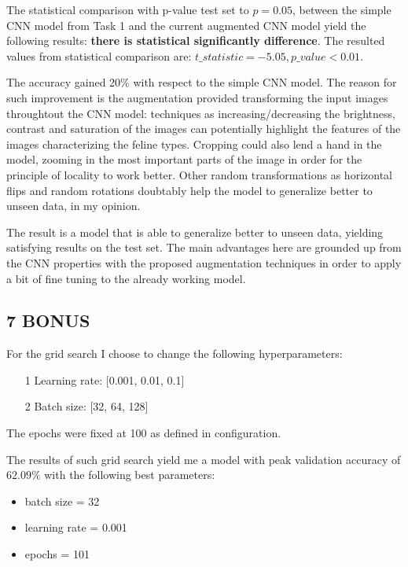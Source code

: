 \documentclass[11pt]{scrartcl}
\begin{document}
The statistical comparison with p-value test set to 
\( p = 0.05 \),
between the simple CNN model from Task 1 and the current augmented CNN model yield 
the following results:
\textbf{there is statistical significantly difference}.
The resulted values from statistical comparison are:
\( t\_statistic = -5.05, p\_value < 0.01 \).

The accuracy gained 20\% with respect to the simple CNN model.
The reason for such improvement is the augmentation provided
transforming the input images throughtout the CNN model:
techniques as increasing/decreasing the brightness, contrast and saturation 
of the images can potentially highlight the features of the images 
characterizing the feline types.
Cropping could also lend a hand in the model, 
zooming in the most important parts of the image
in order for the principle of locality to work better.
Other random transformations as horizontal flips and random rotations
doubtably help the model to generalize better to unseen data, in my opinion.

The result is a model that is able to generalize better to unseen data,
yielding satisfying results on the test set.
The main advantages here are grounded up from the CNN properties 
with the proposed augmentation techniques in order to apply a bit of fine tuning to the already 
working model.


\subsection*{7 BONUS}

For the grid search I choose to change the following hyperparameters:
\begin{itemize}
	\item[1] Learning rate: [0.001, 0.01, 0.1]
	\item[2] Batch size: [32, 64, 128]
\end{itemize}

The epochs were fixed at 100 as defined in configuration.

The results of such grid search yield me a model with peak validation accuracy of
\( 62.09 \% \)
with the following best parameters:

\begin{itemize}
	\item batch size = 32
	\item learning rate = 0.001
	\item epochs = 101
\end{itemize}
\end{document}
